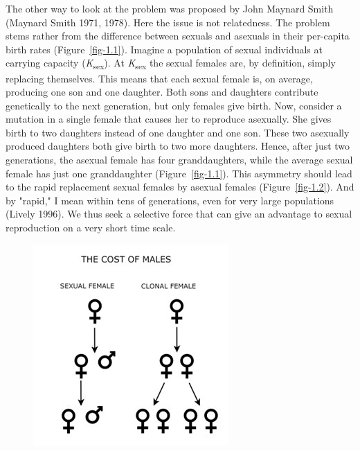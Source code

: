 \documentclass[
  11pt,
  letterpaper,
]{scrbook}
\begin{document}
The other way to look at the problem was proposed by John Maynard Smith
(Maynard Smith 1971, 1978). Here the issue is not relatedness. The
problem stems rather from the difference between sexuals and asexuals in
their per-capita birth rates (Figure~\ref{fig-1.1}). Imagine a
population of sexual individuals at carrying capacity
(\emph{K}\textsubscript{sex}). At \emph{K}\textsubscript{sex} the sexual
females are, by definition, simply replacing themselves. This means that
each sexual female is, on average, producing one son and one daughter.
Both sons and daughters contribute genetically to the next generation,
but only females give birth. Now, consider a mutation in a single female
that causes her to reproduce asexually. She gives birth to two daughters
instead of one daughter and one son. These two asexually produced
daughters both give birth to two more daughters. Hence, after just two
generations, the asexual female has four granddaughters, while the
average sexual female has just one granddaughter (Figure~\ref{fig-1.1}).
This asymmetry should lead to the rapid replacement sexual females by
asexual females (Figure~\ref{fig-1.2}). And by "rapid," I mean within
tens of generations, even for very large populations (Lively 1996). We
thus seek a selective force that can give an advantage to sexual
reproduction on a very short time scale.

\begin{figure}


{\centering \includegraphics{images/fig1-1.jpg}

}

\end{figure}
\end{document}
